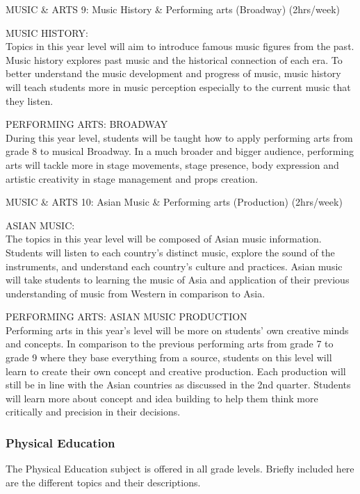 \begin{subject}
	MUSIC \& ARTS 9: Music History \& Performing arts (Broadway) 
	\hfill
	(2hrs/week)
\end{subject}

MUSIC HISTORY: \\
Topics in this year level will aim to introduce famous music figures from the past. Music history explores past music and the historical connection of each era. To better understand the music development and progress of music, music history will teach students more in music perception especially to the current music that they listen.


PERFORMING ARTS: BROADWAY \\
During this year level, students will be taught how to apply performing arts from grade 8 to musical Broadway. In a much broader and bigger audience, performing arts will tackle more in stage movements, stage presence, body expression and artistic creativity in stage management and props creation.

\begin{subject}
	MUSIC \& ARTS 10: Asian Music \& Performing arts (Production)
	\hfill
	(2hrs/week)
\end{subject}

ASIAN MUSIC: \\
The topics in this year level will be composed of Asian music information. Students will listen to each country’s distinct music, explore the sound of the instruments, and understand each country’s culture and practices. Asian music will take students to learning the music of Asia and application of their previous understanding of music from Western in comparison to Asia.

PERFORMING ARTS: ASIAN MUSIC PRODUCTION \\
Performing arts in this year's level will be more on students' own creative minds and concepts. In comparison to the previous performing arts from grade 7 to grade 9 where they base everything from a source, students on this level will learn to create their own concept and creative production. Each production will still be in line with the Asian countries as discussed in the 2nd quarter. Students will learn more about concept and idea building to help them think more critically and precision in their decisions.

\subsubsection{\textbf{Physical Education}}
The Physical Education subject is offered in all grade levels. Briefly included here are the different topics and their descriptions. 

